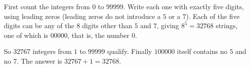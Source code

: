 First count the integers from $0$ to $99999$. Write each one with exactly five digits, using leading zeros (leading zeros do not introduce a $5$ or a $7$). Each of the five digits can be any of the $8$ digits other than $5$ and $7$, giving $8^5=32768$ strings, one of which is $00000$, that is, the number $0$.

So $32767$ integers from $1$ to $99999$ qualify. Finally $100000$ itself contains no $5$ and no $7$. The answer is $32767+1=\boxed{32768}$.
